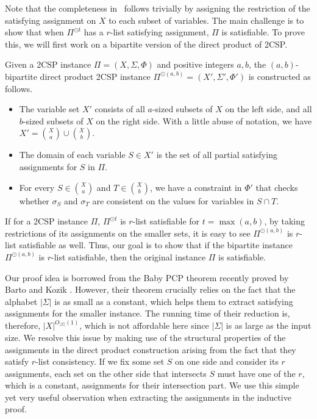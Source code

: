 Note that the completeness in~ follows trivially by assigning the restriction of the satisfying assignment on $X$ to each subset of variables. The main challenge is to show that when $\Pi^{\odot t}$ has a $r$-list satisfying assignment, $\Pi$ is satisfiable. To prove this, we will first work on a bipartite version of the direct product of 2CSP. 
\begin{definition}
    Given a 2CSP instance $\Pi=(X,\Sigma,\Phi)$ and positive integers $a,b$, the $(a,b)$-bipartite direct product 2CSP instance $\Pi^{\odot (a,b)}=(X',\Sigma',\Phi')$ is constructed as follows.
    \begin{itemize}
        \item The variable set $X'$ consists of all $a$-sized subsets of $X$ on the left side, and all $b$-sized subsets of $X$ on the right side. With a little abuse of notation, we have $X' = \binom{X}{a} \cup \binom{X}{b}$.
        \item The domain of each variable $S \in X'$ is the set of all partial satisfying assignments for $S$ in $\Pi$. %
        \item For every $S \in \binom{X}{a}$ and $ T \in \binom{X}{b}$, we have a constraint in $\Phi'$ that checks whether $\sigma_S$ and $\sigma_T$ are consistent on the values for variables in $S \cap T$. 
    \end{itemize} 
\end{definition}

If for a 2CSP instance $\Pi$, $\Pi^{\odot t}$ is $r$-list satisfiable for $t=\max(a,b)$, by taking restrictions of its assignments on the smaller sets, it is easy to see $\Pi^{\odot(a,b)}$ is $r$-list satisfiable as well.
Thus, our goal is to show that if the bipartite instance $\Pi^{\odot(a,b)}$ is $r$-list satisfiable, then the original instance $\Pi$ is satisfiable.  

Our proof idea is borrowed from the Baby PCP theorem recently proved by Barto and Kozik \cite{BK22}. However, their theorem crucially relies on the fact that the alphabet $|\Sigma|$ is as small as a constant, which helps them to extract satisfying assignments for the smaller instance. The running time of their reduction is, therefore, $|X|^{O_{|\Sigma|}(1)}$, which is not affordable here since $|\Sigma|$ is as large as the input size. We resolve this issue by making use of the structural properties of the assignments in the direct product construction arising from the fact that they satisfy $r$-list consistency. 
If we fix some set $S$ on one side and consider its $r$ assignments, each set on the other side that intersects $S$ must have one of the $r$, which is a constant, assignments for their intersection part. We use this simple yet very useful observation when extracting the assignments in the inductive proof. 


